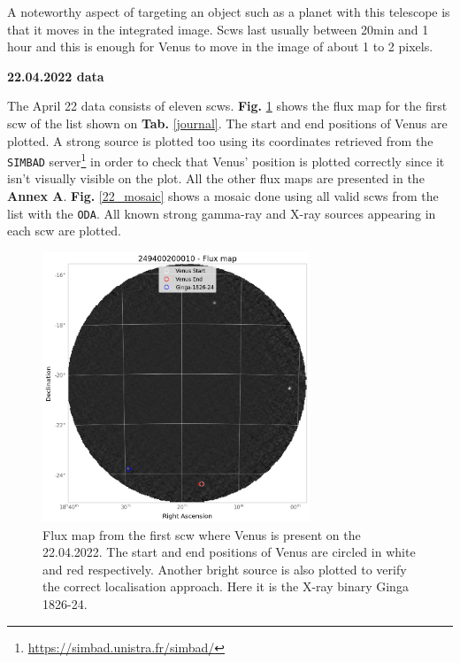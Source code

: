     A noteworthy aspect of targeting an object such as a planet with this telescope is that it moves in the integrated image. Scws last usually between 20min and 1 hour and 
    this is enough for Venus to move in the image of about 1 to 2 pixels.
    
    \textbf{22.04.2022 data}
    
    The April 22 data consists of eleven scws. \textbf{Fig.} \ref{22_map_single} shows the flux map for the first scw of the list shown on \textbf{Tab.} \ref{journal}. The start and end positions of Venus are plotted. A strong source is plotted too using its coordinates retrieved from the \texttt{SIMBAD} server\footnote{\url{https://simbad.unistra.fr/simbad/}} in order to check that Venus' position is plotted correctly since it isn't visually visible on the plot. All the other flux maps are presented in the \textbf{Annex A}. \textbf{Fig.} \ref{22_mosaic} shows a mosaic done using all valid scws from the list with the \texttt{ODA}. All known strong gamma-ray and X-ray sources appearing in each scw are plotted.
    

        \begin{figure}[H]
        \centering
        \includegraphics[width = 8cm]{report/Figures/methods/2204/20_map.png}
        \caption{Flux map from the first scw where Venus is present on the 22.04.2022. The start and end positions of Venus are circled in white and red respectively. Another bright source is also plotted to verify the correct localisation approach. Here it is the X-ray binary Ginga 1826-24.}
        \label{22_map_single}
        \end{figure}

